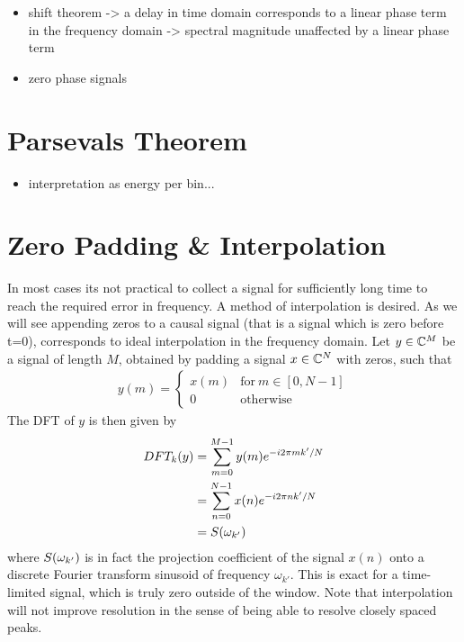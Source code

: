\begin{itemize}
\item shift theorem -> a delay in time domain corresponds to a linear phase term
in the frequency domain -> spectral magnitude unaffected by a linear phase term
\item zero phase signals
\end{itemize}

\section{Parsevals Theorem}
\begin{itemize}
\item interpretation as energy per bin...
\end{itemize}

\section{Zero Padding \& Interpolation}
In most cases its not practical to collect a signal for sufficiently long
time to reach the required error in frequency. A method of interpolation is desired. As we will see appending zeros to a causal signal (that is a signal which is zero before t=0), corresponds to ideal interpolation in the frequency domain. Let $y \in
\mathbb{C}^{M}$ be a signal of length $M$, obtained by padding a signal $x \in
\mathbb{C}^{N}$ with zeros, such that
\begin{align*} y(m) =
  \begin{cases} x(m) & \textrm{for}\ m \in [0,N-1] \\ 0 & \textrm{otherwise}
  \end{cases}
\end{align*} The DFT of $y$ is then given by
\begin{align*} DFT_k(y) &= \sum_{m=0}^{M-1} y(m) e^{- i 2 \pi m k' / N} \\ &=
\sum_{n=0}^{N-1} x(n) e^{- i 2 \pi n k' / N} \\ &= S(\omega_{k'})
\end{align*} where $S(\omega_{k'})$ is in fact the projection
coefficient of the signal $x(n)$ onto a discrete Fourier transform sinusoid of
frequency $\omega_{k'}$. This is exact for a time-limited signal, which is truly
zero outside of the window.
Note that interpolation will not improve resolution in the sense of being able to resolve closely spaced peaks.

